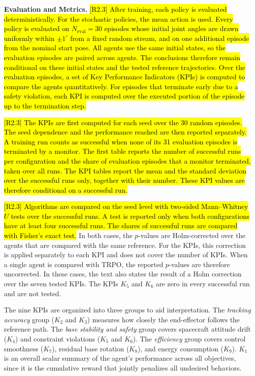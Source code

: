 \documentclass{ieeeaccess}
\newcommand{\hlone}[1]{{\sethlcolor{rone}\hl{#1}}}
\begin{document}
\textbf{Evaluation and Metrics.} \hlone{[R2.3] After training, each policy is evaluated
deterministically. For the stochastic policies, the mean action is used. Every policy is evaluated on
$N_{\mathrm{eval}} = 30$ episodes whose initial joint angles are drawn uniformly within $\pm 1^\circ$
from a fixed random stream, and on one additional episode from the nominal start pose. All agents use
the same initial states, so the evaluation episodes are paired across agents. The conclusions therefore
remain conditional on these initial states and the tested reference trajectories. Over the evaluation
episodes, a set of Key Performance Indicators (KPIs) is computed to compare the agents quantitatively.
For episodes that terminate early due to a safety violation, each KPI is computed over the executed
portion of the episode up to the termination step.}

\hlone{[R2.3] The KPIs are first computed for each seed over the 30 random episodes. The seed
dependence and the performance reached are then reported separately. A training run counts as
successful when none of its 31 evaluation episodes is terminated by a monitor. The first table reports
the number of successful runs per configuration and the share of evaluation episodes that a monitor
terminated, taken over all runs. The KPI tables report the mean and the standard deviation over the
successful runs only, together with their number. These KPI values are therefore conditional on a
successful run.}

\hlone{[R2.3] Algorithms are compared on the seed level with two-sided Mann--Whitney $U$ tests over
the successful runs. A test is reported only when both configurations have at least four successful
runs. The shares of successful runs are compared with Fisher's exact test.} In both cases,
the $p$-values are Holm-corrected over the agents that are compared with the same reference. For the
KPIs, this correction is applied separately to each KPI and does not cover the number of KPIs. When a
single agent is compared with TRPO, the reported $p$-values are therefore uncorrected. In these cases,
the text also states the result of a Holm correction over the seven tested KPIs. The KPIs $K_5$ and
$K_6$ are zero in every successful run and are not tested.

The nine KPIs are organized into three groups to aid interpretation. The \emph{tracking accuracy}
group ($K_2$ and $K_3$) measures how closely the end-effector follows the reference path. The
\emph{base stability and safety} group covers spacecraft attitude drift ($K_4$) and constraint violations ($K_5$
and $K_6$). The \emph{efficiency} group covers control smoothness ($K_7$), residual base rotation ($K_8$), and
energy consumption ($K_9$). $K_1$ is an overall scalar summary of the agent's performance
across all objectives, since it is the cumulative reward that jointly penalizes all undesired
behaviors.
\end{document}
